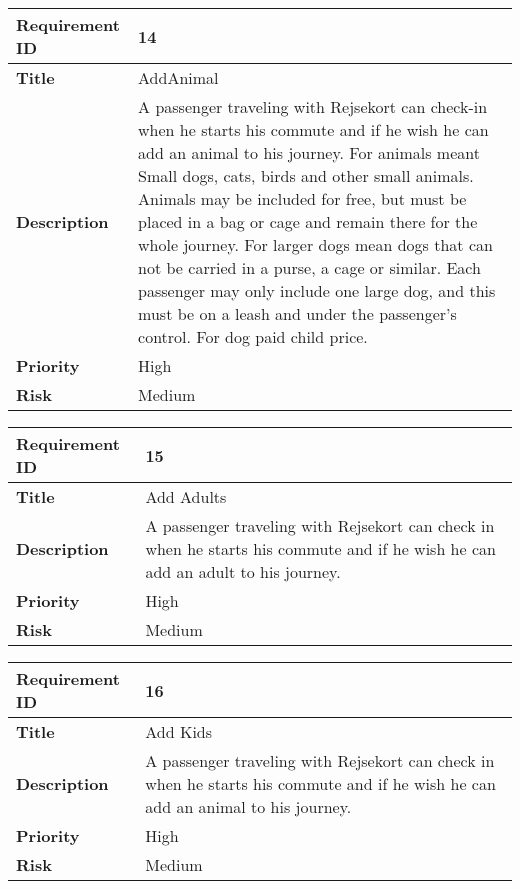 \begin{center}
	\def\arraystretch{1.5}%
    \begin{tabular}{ | p{5cm} | p{5cm} |}
    \hline
    	\textbf{Requirement ID} & 14 \\ \hline
		\textbf{Title} & AddAnimal\\ \hline
		\textbf{Description} & A passenger traveling with Rejsekort can check-in when he starts his commute and if he wish he can add an animal to his journey. For animals meant Small dogs, cats, birds and other small animals. Animals may be included for free, but must be placed in a bag or cage and remain there for the whole journey. For larger dogs mean dogs that can not be carried in a purse, a cage or similar. Each passenger may only include one large dog, and this must be on a leash and under the passenger's control. For dog paid child price.\\ \hline
		\textbf{Priority} & High\\ \hline
		\textbf{Risk} & Medium\\
      \hline
    \end{tabular}
\end{center}

\begin{center}
	\def\arraystretch{1.5}%
    \begin{tabular}{ | p{5cm} | p{5cm} |}
    \hline
    	\textbf{Requirement ID} & 15 \\ \hline
		\textbf{Title} & Add Adults\\ \hline
		\textbf{Description} & A passenger traveling with Rejsekort can check in when he starts his commute and if he wish he can add an adult to his journey.\\ \hline
		\textbf{Priority} & High\\ \hline
		\textbf{Risk} & Medium\\
      \hline
    \end{tabular}
\end{center}

\begin{center}
	\def\arraystretch{1.5}%
    \begin{tabular}{ | p{5cm} | p{5cm} |}
    \hline
    	\textbf{Requirement ID} & 16 \\ \hline
		\textbf{Title} & Add Kids\\ \hline
		\textbf{Description} & A passenger traveling with Rejsekort can check in when he starts his commute and if he wish he can add an animal to his journey.\\ \hline
		\textbf{Priority} & High\\ \hline
		\textbf{Risk} & Medium\\
      \hline
    \end{tabular}
\end{center}

